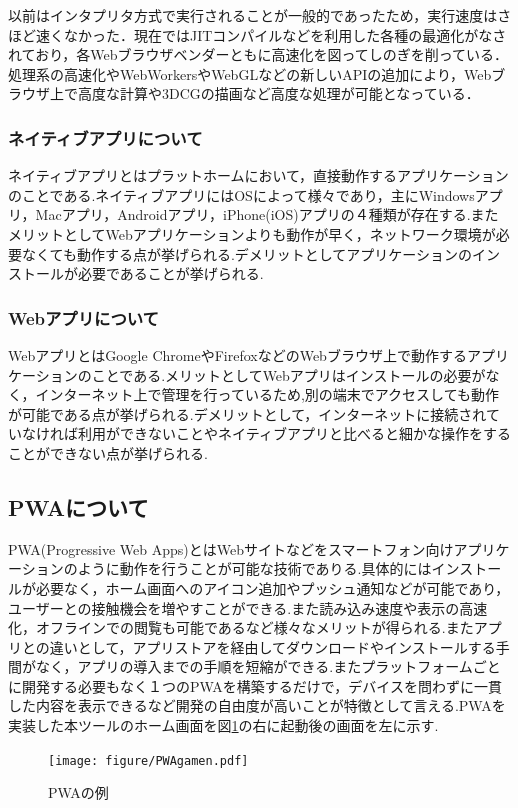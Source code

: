 \documentclass[a4j,12pt]{jarticle}
\begin{document}
以前はインタプリタ方式で実行されることが一般的であったため，実行速度はさほど速くなかった．現在ではJITコンパイルなどを利用した各種の最適化がなされており，各Webブラウザベンダーともに高速化を図ってしのぎを削っている．
処理系の高速化やWebWorkersやWebGLなどの新しいAPIの追加により，Webブラウザ上で高度な計算や3DCGの描画など高度な処理が可能となっている\cite{ren9}．

\subsubsection{ネイティブアプリについて}
ネイティブアプリとはプラットホームにおいて，直接動作するアプリケーションのことである.ネイティブアプリにはOSによって様々であり，主にWindowsアプリ，Macアプリ，Androidアプリ，iPhone(iOS)アプリの４種類が存在する.またメリットとしてWebアプリケーションよりも動作が早く，ネットワーク環境が必要なくても動作する点が挙げられる.デメリットとしてアプリケーションのインストールが必要であることが挙げられる.


\subsubsection{Webアプリについて}
WebアプリとはGoogle ChromeやFirefoxなどのWebブラウザ上で動作するアプリケーションのことである.メリットとしてWebアプリはインストールの必要がなく，インターネット上で管理を行っているため,別の端末でアクセスしても動作が可能である点が挙げられる.デメリットとして，インターネットに接続されていなければ利用ができないことやネイティブアプリと比べると細かな操作をすることができない点が挙げられる.
\newpage
\subsection{PWAについて}
PWA(Progressive Web Apps)とはWebサイトなどをスマートフォン向けアプリケーションのように動作を行うことが可能な技術でありる.具体的にはインストールが必要なく，ホーム画面へのアイコン追加やプッシュ通知などが可能であり，ユーザーとの接触機会を増やすことができる.また読み込み速度や表示の高速化，オフラインでの閲覧も可能であるなど様々なメリットが得られる.またアプリとの違いとして，アプリストアを経由してダウンロードやインストールする手間がなく，アプリの導入までの手順を短縮ができる.またプラットフォームごとに開発する必要もなく１つのPWAを構築するだけで，デバイスを問わずに一貫した内容を表示できるなど開発の自由度が高いことが特徴として言える\cite{ren6}.PWAを実装した本ツールのホーム画面を図\ref{fig:f}の右に起動後の画面を左に示す.
\begin{figure}[h]
\begin{center}
 \texttt{[image: figure/PWAgamen.pdf]}
\end{center}
 \caption{PWAの例}
 \label{fig:f}
\end{figure}
\newpage
\end{document}
